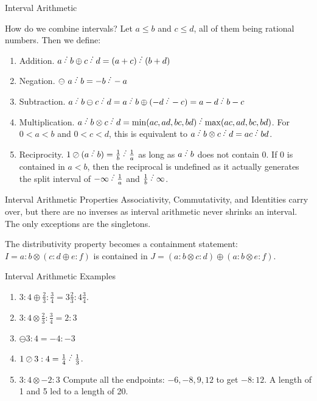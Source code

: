 \documentclass{beamer}
\begin{document}
\begin{frame}{Interval Arithmetic}

    How do we combine intervals?  
    Let $a \leq b$ and $c \leq d$, all of them being rational numbers. Then we define:
\begin{enumerate}
    \item Addition. $a\lte b \oplus c\lte d = (a+c)\lte (b+d)$
    \item Negation. $\ominus\ a\lte b = -b\lte -a$
    \item Subtraction. $a\lte b \ominus c\lte d = a\lte b \oplus (-d\lte -c) = a-d\lte b-c$
    \item Multiplication. $a\lte b \otimes c\lte d = \min(ac, ad, bc, bd)\lte  \max(ac,ad,bc,bd)$. For $0<a<b$ and $0<c<d$, this is equivalent to $a\lte b \otimes c\lte d = ac\lte bd$. 
    \item Reciprocity. $1 \oslash (a\lte b) = \frac{1}{b}\lte \frac{1}{a}$ as long as $a\lte b$ does not contain 0. If 0 is contained in $a \lt b$, then the reciprocal is undefined as it actually generates the split interval of $-\infty\lte \frac{1}{a}$ and $\frac{1}{b}\lte \infty$.
\end{enumerate}



\end{frame}

\begin{frame}{Interval Arithmetic Properties}
    Associativity, Commutativity, and Identities carry over, but there are no inverses as interval arithmetic never shrinks an interval. The only exceptions are the singletons. 
    
    The distributivity property becomes a containment statement:   $I = a:b\otimes(c:d \oplus e:f)$ is contained in $J = (a:b \otimes c:d) \oplus (a:b \otimes e:f)$. 
    
\end{frame}

\begin{frame}{Interval Arithmetic Examples}


    \begin{enumerate}
        \item  $3:4 \oplus \frac{2}{3}:\frac{3}{4} = 3 \frac{2}{3} : 4 \frac{3}{4}$.
        \item  $3:4 \otimes \frac{2}{3}:\frac{3}{4} = 2 : 3$
        \item  $\ominus 3:4 = -4:-3$
        \item  $1\oslash 3:4 = \frac{1}{4} \lte \frac{1}{3}$.
        \item  $3:4 \otimes -2:3$  Compute all the endpoints:  $-6, -8, 9, 12$ to get $-8:12$. A length of 1 and 5 led to a length of 20. 
    \end{enumerate}

\end{frame}
\end{document}
